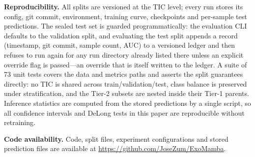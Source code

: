 \documentclass[conference]{IEEEtran}
\begin{document}
\textbf{Reproducibility.} All splits are versioned at the TIC level; every run
stores its config, git commit, environment, training curve, checkpoints and
per-sample test predictions. The sealed test set is guarded programmatically: the
evaluation CLI defaults to the validation split, and evaluating the test split
appends a record (timestamp, git commit, sample count, AUC) to a versioned ledger
and then refuses to run again for any run directory already listed there unless an
explicit override flag is passed---an override that is itself written to the
ledger. A suite of 73 unit tests covers the data and metrics paths and asserts the
split guarantees directly: no TIC is shared across train/validation/test, class
balance is preserved under stratification, and the Tier-2 subsets are nested
inside their Tier-1 parents. Inference statistics are computed from the stored
predictions by a single script, so all confidence intervals and DeLong tests in
this paper are reproducible without retraining.

\textbf{Code availability.} Code, split files, experiment configurations and stored
prediction files are available at \url{https://github.com/JoseZum/ExoMamba}.

\balance
\end{document}
